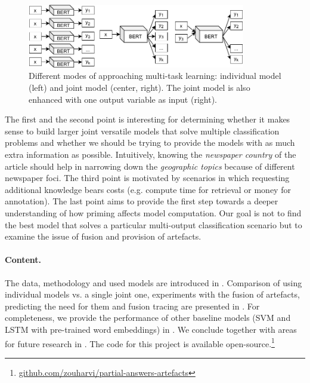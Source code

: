 \begin{figure}[ht]
\centering
\includegraphics[width=0.85\textwidth]{img/diagram_overview.pdf}
\caption{Different modes of approaching multi-task learning: individual model (left) and joint model (center, right). The joint model is also enhanced with one output variable as input (right).}
\label{fig:diagram_overview}
\end{figure}

The first and the second point is interesting for determining whether it makes sense to build larger joint versatile models that solve multiple classification problems and whether we should be trying to provide the models with as much extra information as possible.
Intuitively, knowing the \emph{newspaper country} of the article should help in narrowing down the \emph{geographic topics} because of different newspaper foci. 
The third point is motivated by scenarios in which requesting additional knowledge bears costs (e.g. compute time for retrieval or money for annotation).
The last point aims to provide the first step towards a deeper understanding of how priming affects model computation.
Our goal is not to find the best model that solves a particular multi-output classification scenario but to examine the issue of fusion and provision of artefacts.

\paragraph{Content.}
The data, methodology and used models are introduced in .
Comparison of using individual models vs. a single joint one, experiments with the fusion of artefacts, predicting the need for them and fusion tracing are presented in .
For completeness, we provide the performance of other baseline models (SVM and LSTM with pre-trained word embeddings) in .
We conclude together with areas for future research in .
The code for this project is available open-source.\footnote{
\href{https://github.com/zouharvi/partial-answers-artefacts}{github.com/zouharvi/partial-answers-artefacts}
}

